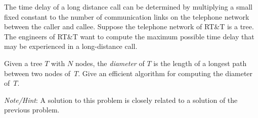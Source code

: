 The time delay of a long distance call can be determined by multiplying
a small fixed constant to the number of communication links on the
telephone network between the caller and callee. Suppose the telephone
network of RT\&T  is a tree.  The engineers of RT\&T  want to compute the
maximum possible time delay that may be experienced in a long-distance
call.

Given a tree $T$ with $N$ nodes, the {\em diameter} of $T$ is the
length of a longest path between two nodes of~$T$.  Give an efficient
algorithm for computing the diameter of~$T$.

{\it Note/Hint}: A solution to this problem is closely related to a solution 
of the previous problem.
